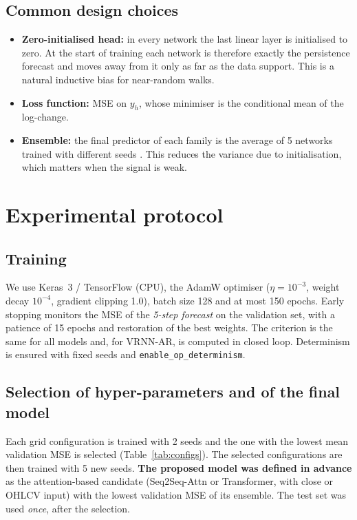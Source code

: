 \documentclass[11pt,a4paper]{article}
\begin{document}
\subsection{Common design choices}
\label{sec:common}
\begin{itemize}[leftmargin=*]
  \item \textbf{Zero-initialised head:} in every network the last linear layer is initialised to zero. At the start of training each network is therefore exactly the persistence forecast and moves away from it only as far as the data support. This is a natural inductive bias for near-random walks.
  \item \textbf{Loss function:} MSE on $y_h$, whose minimiser is the conditional mean of the log-change.
  \item \textbf{Ensemble:} the final predictor of each family is the average of 5 networks trained with different seeds \cite{lakshminarayanan2017}. This reduces the variance due to initialisation, which matters when the signal is weak.
\end{itemize}

\section{Experimental protocol}
\label{sec:exp}

\subsection{Training}
We use Keras~3 / TensorFlow (CPU), the AdamW optimiser \cite{loshchilov2019} ($\eta=10^{-3}$, weight decay $10^{-4}$, gradient clipping 1.0), batch size 128 and at most 150 epochs. Early stopping monitors the MSE of the \emph{5-step forecast} on the validation set, with a patience of 15 epochs and restoration of the best weights. The criterion is the same for all models and, for VRNN-AR, is computed in closed loop. Determinism is ensured with fixed seeds and \texttt{enable\_op\_determinism}.

\subsection{Selection of hyper-parameters and of the final model}
Each grid configuration is trained with 2 seeds and the one with the lowest mean validation MSE is selected (Table~\ref{tab:configs}). The selected configurations are then trained with 5 new seeds. \textbf{The proposed model was defined in advance} as the attention-based candidate (Seq2Seq-Attn or Transformer, with close or OHLCV input) with the lowest validation MSE of its ensemble. The test set was used \emph{once}, after the selection.
\end{document}
